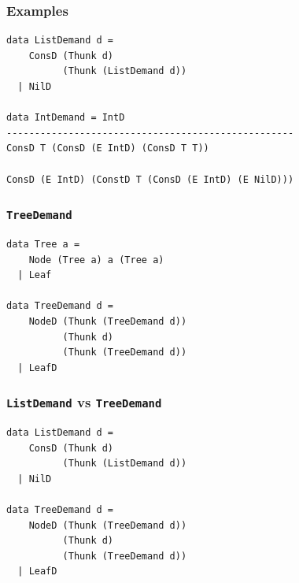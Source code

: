 \documentclass{beamer}
\begin{document}
\begin{frame}[fragile]
\frametitle{Examples}
\begin{verbatim}
data ListDemand d =
    ConsD (Thunk d)
          (Thunk (ListDemand d))
  | NilD

data IntDemand = IntD
---------------------------------------------------
ConsD T (ConsD (E IntD) (ConsD T T))

ConsD (E IntD) (ConstD T (ConsD (E IntD) (E NilD)))
\end{verbatim}
\end{frame}


\begin{frame}[fragile]
\frametitle{\texttt{TreeDemand}}
\begin{verbatim}
data Tree a =
    Node (Tree a) a (Tree a)
  | Leaf

data TreeDemand d =
    NodeD (Thunk (TreeDemand d))
          (Thunk d)
          (Thunk (TreeDemand d))
  | LeafD
\end{verbatim}
\end{frame}


\begin{frame}[fragile]
\frametitle{\texttt{ListDemand} vs \texttt{TreeDemand}}
\begin{verbatim}
data ListDemand d =
    ConsD (Thunk d)
          (Thunk (ListDemand d))
  | NilD

data TreeDemand d =
    NodeD (Thunk (TreeDemand d))
          (Thunk d)
          (Thunk (TreeDemand d))
  | LeafD
\end{verbatim}
\end{frame}
\end{document}
